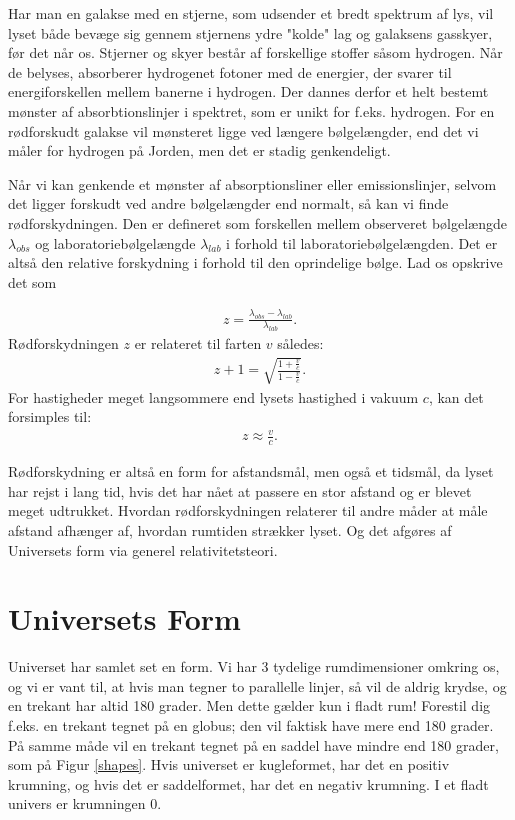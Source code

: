 Har man en galakse med en stjerne, som udsender et bredt spektrum af lys, vil lyset både bevæge sig gennem stjernens ydre "kolde" lag og galaksens gasskyer, før det når os. Stjerner og skyer består af forskellige stoffer såsom hydrogen. Når de belyses, absorberer hydrogenet fotoner med de energier, der svarer til energiforskellen mellem banerne i hydrogen. Der dannes derfor et helt bestemt mønster af absorbtionslinjer i spektret, som er unikt for f.eks. hydrogen. For en rødforskudt galakse vil mønsteret ligge ved længere bølgelængder, end det vi måler for hydrogen på Jorden, men det er stadig genkendeligt.

Når vi kan genkende et mønster af absorptionsliner eller emissionslinjer, selvom det ligger forskudt ved andre bølgelængder end normalt, så kan vi finde rødforskydningen. Den er defineret som forskellen mellem observeret bølgelængde $\lambda_{obs}$ og laboratoriebølgelængde $\lambda_{lab}$ i forhold til laboratoriebølgelængden. Det er altså den relative forskydning i forhold til den oprindelige bølge. Lad os opskrive det som

\begin{align}
z=\frac{\lambda_{obs}-\lambda_{lab}}{\lambda_{lab}}.
\end{align}
Rødforskydningen $z$ er relateret til farten $v$ således:
\begin{align}
z+1=\sqrt{\frac{1+\frac{v}{c}}{1-\frac{v}{c}}}.
\end{align}
For hastigheder meget langsommere end lysets hastighed i vakuum $c$, kan det forsimples til:
\begin{align}
z\approx\frac{v}{c}.
\end{align}

Rødforskydning er altså en form for afstandsmål, men også et tidsmål, da lyset har rejst i lang tid, hvis det har nået at passere en stor afstand og er blevet meget udtrukket. Hvordan rødforskydningen relaterer til andre måder at måle afstand afhænger af, hvordan rumtiden strækker lyset. Og det afgøres af Universets form via generel relativitetsteori.

\section{Universets Form}

Universet har samlet set en form. Vi har 3 tydelige rumdimensioner omkring os, og vi er vant til, at hvis man tegner to parallelle linjer, så vil de aldrig krydse, og en trekant har altid 180 grader. Men dette gælder kun i fladt rum! Forestil dig f.eks. en trekant tegnet på en globus; den vil faktisk have mere end 180 grader. På samme måde vil en trekant tegnet på en saddel have mindre end 180 grader, som på Figur \ref{shapes}. Hvis universet er kugleformet, har det en positiv krumning, og hvis det er saddelformet, har det en negativ krumning. I et fladt univers er krumningen 0.

